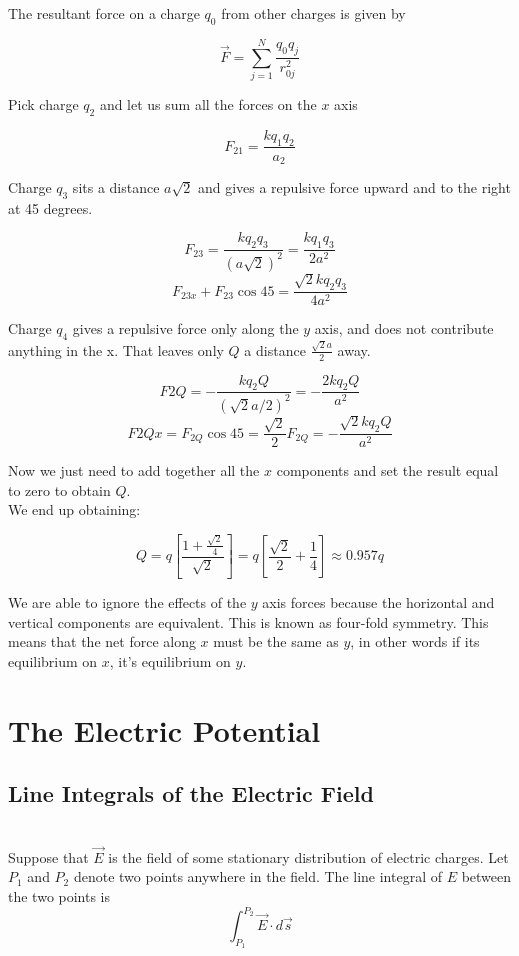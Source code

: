 \documentclass[svgnames]{article}
\begin{document}
The resultant force on a charge $q_0$ from other charges is given by 

\[
  \vec{F} = \sum_{j=1}^{N} \frac{q_0q_j}{r_{0j}^2} 
\]

Pick charge $q_2$ and let us sum all the forces on the $x$ axis

\[
F_{21} = \frac{kq_1q_2}{a_2}
\]

Charge $q_3$ sits a distance $a\sqrt{2}$ and gives a repulsive force upward
and to the right at 45 degrees. 

\[
  F_{23} = \frac{kq_2q_3}{(a\sqrt{2})^2} = \frac{kq_1q_3}{2a^2}
\] 
\[
  F_{23x} + F_{23} \cos 45 = \frac{\sqrt{2}kq_2q_3}{4a^2}
\] 

Charge $q_4$ gives a repulsive force only along the $y$ axis, and does not
contribute anything in the x. That leaves only $Q$ a distance
$\frac{\sqrt{2}a}{2}$ away. 

\[
  F{2Q} = -\frac{kq_2Q}{(\sqrt{2}a/2)^2} = -\frac{2kq_2Q}{a^2}
\] 
\[
  F{2Qx} = F_{2Q} \cos 45 = \frac{\sqrt{2}}{2}F_{2Q}
  = -\frac{\sqrt{2}kq_2Q}{a^2}
\] 

 

Now we just need to add together all the $x$ components and set the result
equal to zero to obtain $Q$. \\

We end up obtaining: 

\[
  Q = q\left[\frac{1+\frac{\sqrt{2}}{4}}{\sqrt{2}}\right]
  = q\left[\frac{\sqrt{2}}{2} + \frac{1}{4}\right] \approx 0.957q
\]

We are able to ignore the effects of the $y$ axis forces because the horizontal
and vertical components are equivalent. This is known as four-fold symmetry.
This means that the net force along $x$ must be the same as $y$, in other words
if its equilibrium on  $x$, it's equilibrium on  $y$. 



\newpage

\section{The Electric Potential} 

\subsection{Line Integrals of the Electric Field} \mbox{} \\

Suppose that $\vec{E}$ is the field of some stationary distribution of electric
charges. Let $P_1$ and $P_2$ denote two points anywhere in the field. The line
integral of $E$ between the two points is 
\[ \int_{P_1}^{P_2} \vec{E} \cdot d\vec{s} \] \\
\end{document}

